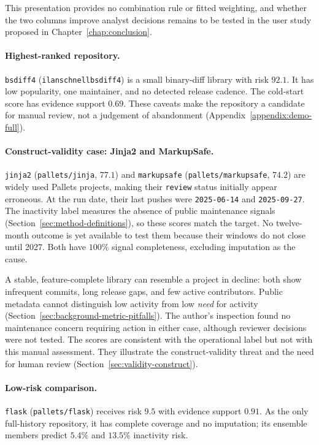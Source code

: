 This presentation provides no combination rule or fitted weighting, and whether
the two columns improve analyst decisions remains to be tested in the user study
proposed in Chapter~\ref{chap:conclusion}.

\paragraph{Highest-ranked repository.} \texttt{bsdiff4}
(\texttt{ilanschnell\sslash bsdiff4}) is a small binary-diff library with risk
\(92.1\). It has low popularity, one maintainer, and no detected release cadence.
The cold-start score has evidence support \(0.69\). These caveats make the
repository a candidate for manual review, not a judgement of abandonment
(Appendix~\ref{appendix:demo-full}).

\paragraph{Construct-validity case: Jinja2 and MarkupSafe.}
\texttt{jinja2} (\texttt{pallets/jinja}, \(77.1\)) and
\texttt{markupsafe} (\texttt{pallets/markupsafe}, \(74.2\)) are widely used
Pallets projects, making their \texttt{review} status initially appear erroneous.
At the run date, their last pushes were \texttt{2025-06-14} and
\texttt{2025-09-27}. The inactivity label measures the absence of public
maintenance signals (Section~\ref{sec:method-definitions}), so these scores match
the target. No twelve-month outcome is yet available to test them because their
windows do not close until 2027. Both have \(100\%\) signal completeness,
excluding imputation as the cause.

A stable, feature-complete library can resemble a project in decline: both show
infrequent commits, long release gaps, and few active contributors. Public
metadata cannot distinguish low activity from low \emph{need} for activity
(Section~\ref{sec:background-metric-pitfalls}). The author's inspection found no
maintenance concern requiring action in either case, although reviewer decisions
were not tested. The scores are consistent with the operational label but not
with this manual assessment. They illustrate the construct-validity threat and
the need for human review
(Section~\ref{sec:validity-construct}).

\paragraph{Low-risk comparison.}
\texttt{flask} (\texttt{pallets/flask}) receives risk \(9.5\) with evidence
support \(0.91\). As the only full-history repository, it has complete coverage
and no imputation; its ensemble members predict \(5.4\%\) and \(13.5\%\)
inactivity risk.

